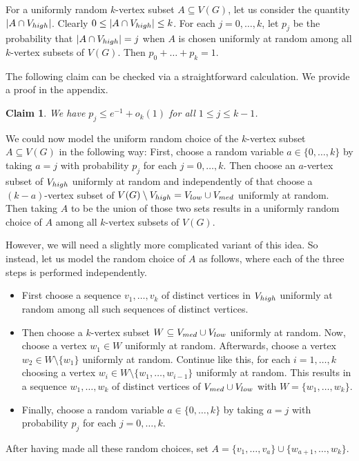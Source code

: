 \documentclass[11pt]{article}
\newtheorem{claim}[theorem]{Claim}
\theoremstyle{definition}
\numberwithin{equation}{section}
\begin{document}
For a uniformly random $k$-vertex subset $A\subseteq V(G)$, let us consider the quantity $\vert A\cap V_{\textnormal{high}}\vert$. Clearly $0\leq \vert A\cap V_{\textnormal{high}}\vert\leq k$. For each $j=0,\dots,k$, let $p_j$ be the probability that $\vert A\cap V_{\textnormal{high}}\vert=j$ when $A$ is chosen uniformly at random among all $k$-vertex subsets of $V(G)$. Then $p_0+\dots+p_k=1$.

The following claim can be checked via a straightforward calculation. We provide a proof in the appendix.

\begin{claim}\label{claim-p-j-1-e}
We have $p_j\leq e^{-1}+o_k(1)$ for all $1\leq j\leq k-1$.
\end{claim}


We could now model the uniform random choice of the $k$-vertex subset $A\subseteq V(G)$ in the following way: First, choose a random variable $a\in \lbrace 0,\dots,k\rbrace$ by taking $a=j$ with probability $p_j$ for each $j=0,\dots,k$. Then choose an $a$-vertex subset of $V_{\textnormal{high}}$ uniformly at random and independently of that choose a $(k-a)$-vertex subset of $V(G)\setminus V_{\textnormal{high}}=V_{\textnormal{low}}\cup V_{\textnormal{med}}$ uniformly at random. Then taking $A$ to be the union of those two sets results in a uniformly random choice of $A$ among all $k$-vertex subsets of $V(G)$.

However, we will need a slightly more complicated variant of this idea. So instead, let us model the random choice of $A$ as follows, where each of the three steps is performed independently.
\begin{itemize}
\item First choose a sequence $v_1,\dots,v_k$ of distinct vertices in $V_{\textnormal{high}}$ uniformly at random among all such sequences of distinct vertices.
\item Then choose a $k$-vertex subset $W\subseteq V_{\textnormal{med}}\cup V_{\textnormal{low}}$ uniformly at random. Now, choose a vertex $w_1\in W$ uniformly at random. Afterwards, choose a vertex $w_2\in W\setminus \lbrace w_1\rbrace$ uniformly at random. Continue like this, for each $i=1,\dots,k$ choosing a vertex $w_i\in W\setminus \lbrace w_1,\dots,w_{i-1}\rbrace$ uniformly at random. This results in a sequence $w_1,\dots,w_k$ of distinct vertices of $V_{\textnormal{med}}\cup V_{\textnormal{low}}$ with $W=
\lbrace w_1,\dots,w_k\rbrace$.
\item Finally, choose a random variable $a\in \lbrace 0,\dots,k\rbrace$ by taking $a=j$ with probability $p_j$ for each $j=0,\dots,k$.
\end{itemize}
After having made all these random choices, set $A=\lbrace v_1,\dots,v_a\rbrace\cup \lbrace w_{a+1},\dots,w_k\rbrace$.
\end{document}
